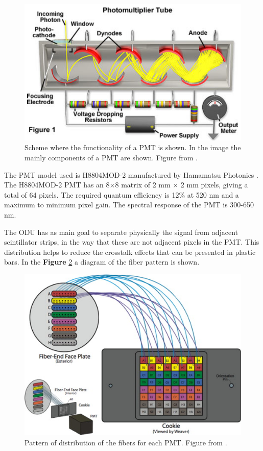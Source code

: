 \begin{figure}[!htb]
    \centering
    \includegraphics[scale=0.5]{Figures/Chapter2/PMT.png}
    \caption{Scheme where the functionality of a PMT is shown. In the image the mainly components of a PMT are shown. Figure from \cite{PMTHamamatsu}.}
    \label{fig:MnvExp:MnvDetector:PMTfunctionality}
\end{figure}



The PMT model used is H8804MOD-2 manufactured by Hamamatsu Photonics \cite{hamamatsu2007photomultiplier}. The H8804MOD-2 PMT has an 8$\times$8 matrix of 2 mm $\times$ 2 mm pixels, giving a total of 64 pixels. The required quantum efficiency is 12\% at 520 nm and a maximum to minimum pixel gain. The spectral response of the PMT is 300-650 nm.    

The ODU has as main goal to separate physically the signal from adjacent scintillator strips, in the way that these are not adjacent pixels in the PMT. This distribution helps to reduce the crosstalk effects that can be presented in plastic bars. In the \textbf{Figure} \ref{fig:MnvExp:MnvDetector:ODU} a diagram of the fiber pattern is shown. 

\begin{figure}[!htb]
    \centering
    \includegraphics{Figures/Chapter2/ODU.jpg}
    \caption{Pattern of distribution of the fibers for each PMT. Figure from \cite{MINERvA}.}
    \label{fig:MnvExp:MnvDetector:ODU}
\end{figure}

